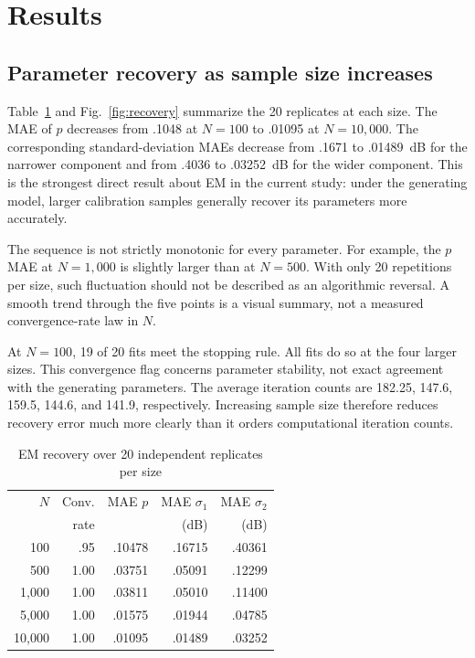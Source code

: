 \documentclass[conference,letterpaper]{IEEEtran}
\begin{document}
\section{Results}
\subsection{Parameter recovery as sample size increases}
Table~\ref{tab:sample} and Fig.~\ref{fig:recovery} summarize the 20 replicates at each size. The MAE of $p$ decreases from .1048 at $N=100$ to .01095 at $N=10{,}000$. The corresponding standard-deviation MAEs decrease from .1671 to .01489~dB for the narrower component and from .4036 to .03252~dB for the wider component. This is the strongest direct result about EM in the current study: under the generating model, larger calibration samples generally recover its parameters more accurately.

The sequence is not strictly monotonic for every parameter. For example, the $p$ MAE at $N=1{,}000$ is slightly larger than at $N=500$. With only 20 repetitions per size, such fluctuation should not be described as an algorithmic reversal. A smooth trend through the five points is a visual summary, not a measured convergence-rate law in $N$.

At $N=100$, 19 of 20 fits meet the stopping rule. All fits do so at the four larger sizes. This convergence flag concerns parameter stability, not exact agreement with the generating parameters. The average iteration counts are 182.25, 147.6, 159.5, 144.6, and 141.9, respectively. Increasing sample size therefore reduces recovery error much more clearly than it orders computational iteration counts.

\begin{table}[t]
\caption{EM recovery over 20 independent replicates per size}
\label{tab:sample}
\centering\small
\begin{tabular}{@{}rrrrr@{}}
\toprule
$N$ & Conv. & MAE $p$ & MAE $\sigma_1$ & MAE $\sigma_2$\\
& rate & & (dB) & (dB)\\\midrule
100 & .95 & .10478 & .16715 & .40361\\
500 & 1.00 & .03751 & .05091 & .12299\\
1,000 & 1.00 & .03811 & .05010 & .11400\\
5,000 & 1.00 & .01575 & .01944 & .04785\\
10,000 & 1.00 & .01095 & .01489 & .03252\\
\bottomrule
\end{tabular}
\end{table}
\end{document}
